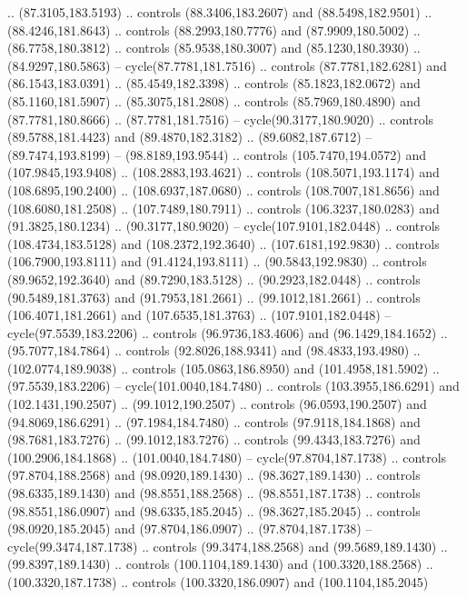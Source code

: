 \begin{scope}[cm={{1.25,0.0,0.0,-1.25,(0.0,442.91375)}}]
    .. (87.3105,183.5193) .. controls (88.3406,183.2607) and (88.5498,182.9501) ..
    (88.4246,181.8643) .. controls (88.2993,180.7776) and (87.9909,180.5002) ..
    (86.7758,180.3812) .. controls (85.9538,180.3007) and (85.1230,180.3930) ..
    (84.9297,180.5863) -- cycle(87.7781,181.7516) .. controls (87.7781,182.6281)
    and (86.1543,183.0391) .. (85.4549,182.3398) .. controls (85.1823,182.0672)
    and (85.1160,181.5907) .. (85.3075,181.2808) .. controls (85.7969,180.4890)
    and (87.7781,180.8666) .. (87.7781,181.7516) -- cycle(90.3177,180.9020) ..
    controls (89.5788,181.4423) and (89.4870,182.3182) .. (89.6082,187.6712) --
    (89.7474,193.8199) -- (98.8189,193.9544) .. controls (105.7470,194.0572) and
    (107.9845,193.9408) .. (108.2883,193.4621) .. controls (108.5071,193.1174) and
    (108.6895,190.2400) .. (108.6937,187.0680) .. controls (108.7007,181.8656) and
    (108.6080,181.2508) .. (107.7489,180.7911) .. controls (106.3237,180.0283) and
    (91.3825,180.1234) .. (90.3177,180.9020) -- cycle(107.9101,182.0448) ..
    controls (108.4734,183.5128) and (108.2372,192.3640) .. (107.6181,192.9830) ..
    controls (106.7900,193.8111) and (91.4124,193.8111) .. (90.5843,192.9830) ..
    controls (89.9652,192.3640) and (89.7290,183.5128) .. (90.2923,182.0448) ..
    controls (90.5489,181.3763) and (91.7953,181.2661) .. (99.1012,181.2661) ..
    controls (106.4071,181.2661) and (107.6535,181.3763) .. (107.9101,182.0448) --
    cycle(97.5539,183.2206) .. controls (96.9736,183.4606) and (96.1429,184.1652)
    .. (95.7077,184.7864) .. controls (92.8026,188.9341) and (98.4833,193.4980) ..
    (102.0774,189.9038) .. controls (105.0863,186.8950) and (101.4958,181.5902) ..
    (97.5539,183.2206) -- cycle(101.0040,184.7480) .. controls (103.3955,186.6291)
    and (102.1431,190.2507) .. (99.1012,190.2507) .. controls (96.0593,190.2507)
    and (94.8069,186.6291) .. (97.1984,184.7480) .. controls (97.9118,184.1868)
    and (98.7681,183.7276) .. (99.1012,183.7276) .. controls (99.4343,183.7276)
    and (100.2906,184.1868) .. (101.0040,184.7480) -- cycle(97.8704,187.1738) ..
    controls (97.8704,188.2568) and (98.0920,189.1430) .. (98.3627,189.1430) ..
    controls (98.6335,189.1430) and (98.8551,188.2568) .. (98.8551,187.1738) ..
    controls (98.8551,186.0907) and (98.6335,185.2045) .. (98.3627,185.2045) ..
    controls (98.0920,185.2045) and (97.8704,186.0907) .. (97.8704,187.1738) --
    cycle(99.3474,187.1738) .. controls (99.3474,188.2568) and (99.5689,189.1430)
    .. (99.8397,189.1430) .. controls (100.1104,189.1430) and (100.3320,188.2568)
    .. (100.3320,187.1738) .. controls (100.3320,186.0907) and (100.1104,185.2045)

\end{scope}
